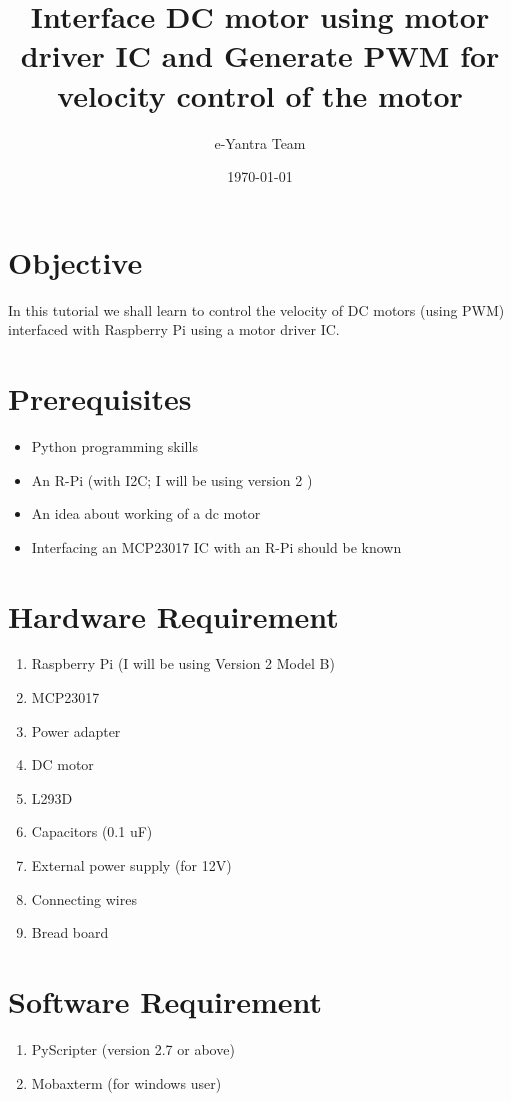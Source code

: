 \documentclass[11pt,a4paper]{article}
\title{Interface DC motor using motor driver IC and Generate PWM for velocity control of the motor}
\author{e-Yantra Team}
\date{\today}
\begin{document}
	\maketitle
	\newpage
	\tableofcontents
	\newpage
	\section{Objective}
	In this tutorial we shall learn to control the velocity of DC motors (using PWM) interfaced with Raspberry Pi using a motor driver IC.
	
	\section{Prerequisites}
	\begin{itemize}
		\item Python programming skills
		\item An R-Pi (with I2C; I will be using version 2 ) 
		\item An idea about working of a dc motor
		\item Interfacing an MCP23017 IC with an R-Pi should be known
	\end{itemize}
	
	\section{Hardware Requirement}
	\begin{enumerate}
		\item Raspberry Pi (I will be using Version 2 Model B)
		\item MCP23017
		\item Power adapter
	    \item DC motor
	    \item L293D
	    \item Capacitors (0.1 uF)
	    \item External power supply (for 12V)
	    \item Connecting wires
		\item Bread board
	\end{enumerate}
	
	\section{Software Requirement}
	\begin{enumerate}
		\item PyScripter (version 2.7 or above)
		\item Mobaxterm (for windows user)
	\end{enumerate}
	
\end{document}
